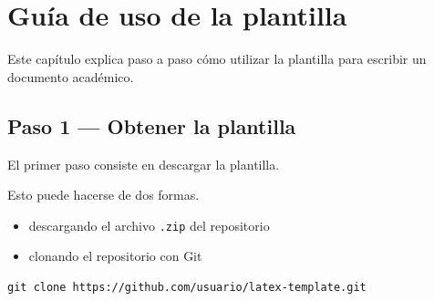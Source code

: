 %
%
%
%
%
%
%
%
%
%


\chapter{Guía de uso de la plantilla}

Este capítulo explica paso a paso cómo utilizar la
plantilla para escribir un documento académico.




\section{Paso 1 — Obtener la plantilla}

El primer paso consiste en descargar la plantilla.

Esto puede hacerse de dos formas.

\begin{itemize}

\item descargando el archivo \texttt{.zip} del repositorio
\item clonando el repositorio con Git

\end{itemize}



\begin{lstlisting}[caption={Clonar repositorio},label={code:clone}]
git clone https://github.com/usuario/latex-template.git
\end{lstlisting}





